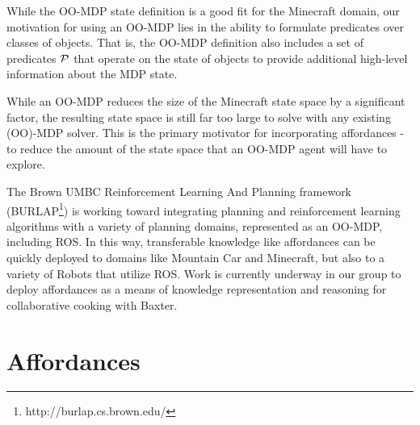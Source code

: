 \documentclass[letterpaper]{article}
\begin{document}
While the OO-MDP state definition is a good fit for the Minecraft
domain, our motivation for using an OO-MDP lies in the ability to
formulate predicates over classes of objects. That is, the OO-MDP
definition also includes a set of predicates ${\cal P}$ that operate
on the state of objects to provide additional high-level information
about the MDP state. 

While an OO-MDP reduces the size of the Minecraft state space
by a significant factor, the resulting state space is still far too large to
solve with any existing (OO)-MDP solver. This is the primary motivator
for incorporating affordances - to reduce the amount of the
state space that an OO-MDP agent will have to explore.

The Brown UMBC Reinforcement Learning And Planning framework (BURLAP\footnote{http://burlap.cs.brown.edu/})
is working toward integrating planning and reinforcement learning algorithms with a variety of planning domains, represented
as an OO-MDP, including ROS. In this way, transferable knowledge like affordances can be quickly deployed
to domains like Mountain Car \cite{Moore90efficientmemory-based} and Minecraft, but also to a variety
of Robots that utilize ROS. Work is currently underway in our group to deploy affordances as a
means of knowledge representation and reasoning for collaborative cooking with Baxter.

\section{Affordances}
\label{sec:affordances}
\end{document}
